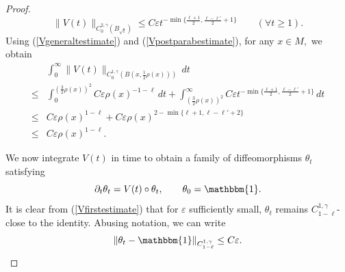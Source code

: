 \documentclass[12pt]{amsart}
\renewcommand{\1}{{\mathbf 1}}
\newcommand{\eps}{{\varepsilon}}
\theoremstyle{others}
\numberwithin{equation}{section}
\begin{document}
\begin{proof}
\begin{equation}\label{Vpostparabestimate}
    \|V(t) \|_{C^{2,\gamma}_0(B_{\sqrt{t}})} \leq C \eps t^{- \min \{ \frac{\ell + 1}{2} , \frac{\ell - \ell'}{2} + 1 \} } 
    \qquad ( \forall t \ge 1).
\end{equation}
Using (\ref{Vgeneraltestimate}) and (\ref{Vpostparabestimate}),  for any $x \in M,$ we obtain
\begin{equation}\label{Vfirstestimate}
\begin{split}
    & \int_{0}^\infty \|V(t) \|_{C^{1, \gamma}_0\left( B\left(x, \frac12 \rho(x) \right) \right) } \, dt \\
    \leq{}& \int_{0}^{\left( \frac32 \rho(x)\right)^2} C \eps \rho(x)^{-1-\ell} \, dt + \int_{\left( \frac32 \rho(x)\right)^2}^\infty C \eps t^{- \min \{ \frac{\ell + 1}{2} , \frac{\ell - \ell'}{2} + 1 \} } \, dt \\
    \leq{}& C \eps \rho(x)^{1 - \ell} + C \eps \rho(x)^{2 - \min\{\ell + 1, \ell - \ell' +2\}} \\
    \leq{}& C \eps \rho(x)^{1 - \ell}.
    \end{split}
\end{equation}



We now integrate $V(t)$ in time to obtain a family of diffeomorphisms $\theta_t$ 
 satisfying
    $$\partial_t \theta_t = V(t) \circ \theta_t , \qquad \theta_0 = \mathbbm{1}.$$
It is clear from (\ref{Vfirstestimate}) that for $\eps$ sufficiently small, $\theta_t$ remains $C^{1,\gamma}_{1-\ell}$-close to the identity. Abusing notation, we can write
$$\|\theta_t - \mathbbm{1} \|_{C^{1, \gamma}_{1 - \ell}} \leq C \eps.$$


\end{proof}
\end{document}
